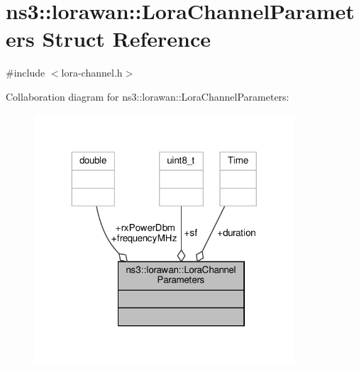 \hypertarget{structns3_1_1lorawan_1_1LoraChannelParameters}{}\section{ns3\+:\+:lorawan\+:\+:Lora\+Channel\+Parameters Struct Reference}
\label{structns3_1_1lorawan_1_1LoraChannelParameters}


{\ttfamily \#include $<$lora-\/channel.\+h$>$}



Collaboration diagram for ns3\+:\+:lorawan\+:\+:Lora\+Channel\+Parameters\+:
\nopagebreak
\begin{figure}[H]
\begin{center}
\leavevmode
\includegraphics[width=275pt]{structns3_1_1lorawan_1_1LoraChannelParameters__coll__graph}
\end{center}
\end{figure}
